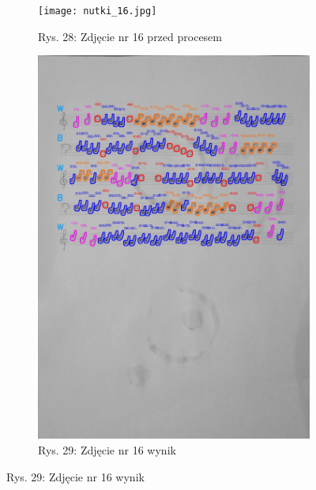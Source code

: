 \documentclass[11pt]{article}
\begin{document}
\begin{figure}[H]
    \centering
    \captionsetup[subfigure]{labelformat=empty}
    \begin{subfigure}[b]{0.475\textwidth}
        \centering
        \graphicspath{ {Resources/} }
        \texttt{[image: nutki\_16.jpg]}
        \caption[]%
        {{\small Rys. 28: Zdjęcie nr 16 przed procesem}}
        \label{fig:sub1}
    \end{subfigure}
    \hfill
    \begin{subfigure}[b]{0.475\textwidth}
        \centering
        \graphicspath{ {blobs/} }
        \includegraphics[width=\textwidth]{16_cnts.jpg}
        \caption[]%
        {{\small Rys. 29: Zdjęcie nr 16 wynik}}
        \label{fig:sub2}
    \end{subfigure}
\end{figure}
\end{document}
